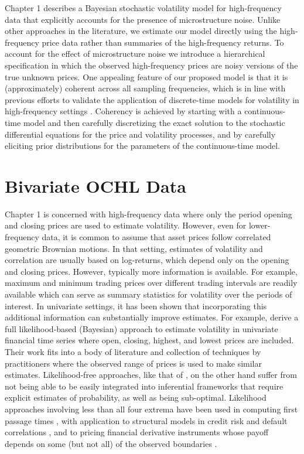 Chapter 1 describes a Bayesian stochastic volatility model for
high-frequency data that explicitly accounts for the presence of
microstructure noise.  Unlike other approaches in the literature, we
estimate our model directly using the high-frequency price data rather
than summaries of the high-frequency returns.  To account for the
effect of microstructure noise we introduce a hierarchical
specification in which the observed high-frequency prices are noisy
versions of the true unknown prices.  One appealing feature of our
proposed model is that it is (approximately) coherent across all
sampling frequencies, which is in line with previous efforts to
validate the application of discrete-time models for volatility in
high-frequency settings \citep{andersen1999forecasting}.  Coherency is
achieved by starting with a continuous-time model and then carefully
discretizing the exact solution to the stochastic differential
equations for the price and volatility processes, and by carefully
eliciting prior distributions for the parameters of the
continuous-time model.

\section{Bivariate OCHL Data}
Chapter 1 is concerned with high-frequency data where only the period
opening and closing prices are used to estimate volatility. However,
even for lower-frequency data, it is common to assume that asset
prices follow correlated geometric Brownian motions. In that setting,
estimates of volatility and correlation are usually based on
log-returns, which depend only on the opening and closing prices.
However, typically more information is available.  For example,
maximum and minimum trading prices over different trading intervals
are readily available which can serve as summary statistics for
volatility over the periods of interest.  In univariate settings, it
has been shown that incorporating this additional information can
substantially improve estimates. For example, \cite{rodriguez2012}
derive a full likelihood-based (Bayesian) approach to estimate
volatility in univariate financial time series where open, closing,
highest, and lowest prices are included. Their work fits into a body
of literature and collection of techniques by practitioners where the
observed range of prices is used to make similar
estimates. Likelihood-free approaches, like that of
\cite{rogers1991estimating, rogers2008estimating}, on the other
hand suffer from not being able to be easily integrated into
inferential frameworks that require explicit estimates of probability,
as well as being sub-optimal. Likelihood approaches involving less
than all four extrema have been used in computing first passage times
\cite{kou2016first, sacerdote2016first}, with application to
structural models in credit risk and default correlations
\cite{haworth2008modelling, ching2014correlated}, and to pricing
financial derivative instruments whose payoff depends on some (but not
all) of the observed boundaries \citep{he1998double}.

